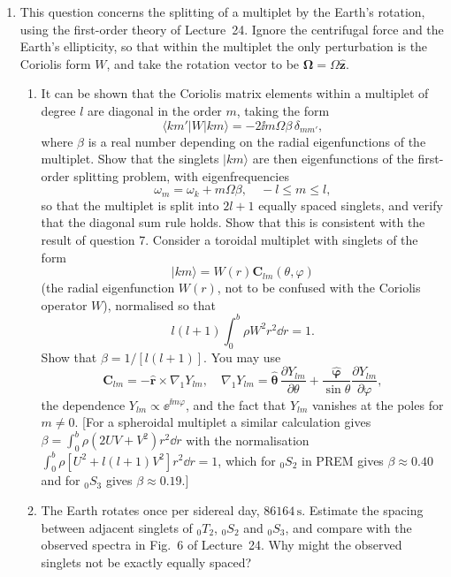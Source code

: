 \begin{enumerate}
\item This question concerns the splitting of a multiplet by the Earth's rotation, using the first-order theory of Lecture~24. Ignore 
the centrifugal force and the Earth's ellipticity, so that within the multiplet the only perturbation is the Coriolis form $W$, and take 
the rotation vector to be $\bm{\Omega}=\Omega\hat{\mathbf{z}}$.
\begin{enumerate}
\item It can be shown that the Coriolis matrix elements within a multiplet of degree $l$ are diagonal in the order $m$, taking the form
\begin{equation*}
    \langle km'|W|km\rangle=-2\ii m\Omega\beta\,\delta_{mm'},
\end{equation*}
where $\beta$ is a real number depending on the radial eigenfunctions of the multiplet. Show that the singlets $|km\rangle$ are then 
eigenfunctions of the first-order splitting problem, with eigenfrequencies
\begin{equation*}
    \omega_{m}=\omega_{k}+m\Omega\beta, \quad -l\le m\le l,
\end{equation*}
so that the multiplet is split into $2l+1$ equally spaced singlets, and verify that the diagonal sum rule holds. Show that this 
is consistent with the result of question 7.
\hardp Consider a toroidal multiplet with singlets of the form
\begin{equation*}
    |km\rangle=W(r)\mathbf{C}_{lm}(\theta,\varphi)
\end{equation*}
(the radial eigenfunction $W(r)$, not to be confused with the Coriolis operator $W$), normalised so that
\begin{equation*}
    l(l+1)\int_{0}^{b}\rho W^{2}r^{2}\dd r=1.
\end{equation*}
Show that $\beta=1/[l(l+1)]$. You may use 
\begin{equation*}
    \mathbf{C}_{lm}=-\hat{\mathbf{r}}\times\nabla_{1}Y_{lm}, \quad 
    \nabla_{1}Y_{lm}=\hat{\bm{\theta}}\,\frac{\partial Y_{lm}}{\partial\theta}+\frac{\hat{\bm{\varphi}}}{\sin\theta}\frac{\partial Y_{lm}}{\partial\varphi},
\end{equation*}
the dependence $Y_{lm}\propto\ee^{\ii m\varphi}$, and the fact that $Y_{lm}$ vanishes at the poles for $m\ne0$. 
[For a spheroidal multiplet a similar calculation gives 
$\beta=\int_{0}^{b}\rho(2UV+V^{2})r^{2}\dd r$ with the normalisation $\int_{0}^{b}\rho[U^{2}+l(l+1)V^{2}]r^{2}\dd r=1$, 
which for ${}_{0}S_{2}$ in PREM gives $\beta\approx0.40$ and for ${}_{0}S_{3}$ gives $\beta\approx0.19$.]
\item The Earth rotates once per sidereal day, $86164\,\mathrm{s}$. Estimate the spacing between adjacent singlets of 
${}_{0}T_{2}$, ${}_{0}S_{2}$ and ${}_{0}S_{3}$, and compare with the observed spectra in Fig.~6 of Lecture~24. Why might the observed 
singlets not be exactly equally spaced?
\end{enumerate}

\end{enumerate}
